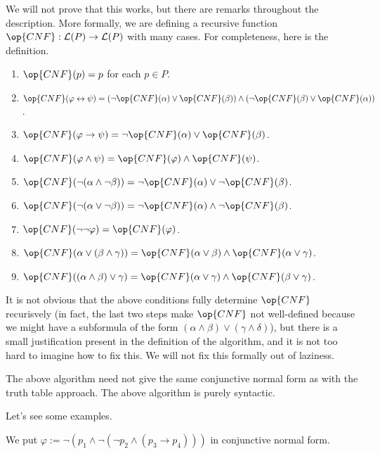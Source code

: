 We will not prove that this works, but there are remarks throughout the description. More formally, we are defining a recursive function $\op{CNF}:\mathcal L(P)\to\mathcal L(P)$ with many cases. For completeness, here is the definition.
\begin{enumerate}
	\item $\op{CNF}(p)=p$ for each $p\in P$.
	\item $\op{CNF}(\varphi\leftrightarrow\psi)=(\lnot\op{CNF}(\alpha)\lor\op{CNF}(\beta))\land(\lnot\op{CNF}(\beta)\lor\op{CNF}(\alpha))$.
	\item $\op{CNF}(\varphi\to\psi)=\lnot\op{CNF}(\alpha)\lor\op{CNF}(\beta)$.
	\item $\op{CNF}(\varphi\land\psi)=\op{CNF}(\varphi)\land\op{CNF}(\psi)$.
	\item $\op{CNF}(\lnot(\alpha\land\lnot\beta))=\lnot\op{CNF}(\alpha)\lor\lnot\op{CNF}(\beta)$.
	\item $\op{CNF}(\lnot(\alpha\lor\lnot\beta))=\lnot\op{CNF}(\alpha)\land\lnot\op{CNF}(\beta)$.
	\item $\op{CNF}(\lnot\lnot\varphi)=\op{CNF}(\varphi)$.
	\item $\op{CNF}(\alpha\lor(\beta\land\gamma))=\op{CNF}(\alpha\lor\beta)\land\op{CNF}(\alpha\lor\gamma)$.
	\item $\op{CNF}((\alpha\land\beta)\lor\gamma)=\op{CNF}(\alpha\lor\gamma)\land\op{CNF}(\beta\lor\gamma)$.
\end{enumerate}
It is not obvious that the above conditions fully determine $\op{CNF}$ recurisvely (in fact, the last two steps make $\op{CNF}$ not well-defined because we might have a subformula of the form $(\alpha\land\beta)\lor(\gamma\land\delta)$), but there is a small justification present in the definition of the algorithm, and it is not too hard to imagine how to fix this. We will not fix this formally out of laziness.
\begin{remark}
	The above algorithm need not give the same conjunctive normal form as with the truth table approach. The above algorithm is purely syntactic.
\end{remark}
Let's see some examples.
\begin{exe}
	We put $\varphi:=\lnot(p_1\land\lnot(\lnot p_2\land(p_3\to p_4)))$ in conjunctive normal form.
\end{exe}
